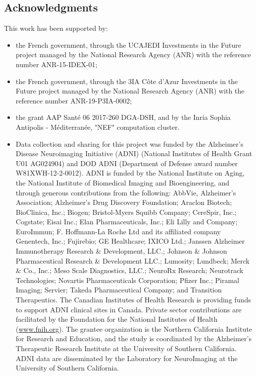 \subsection*{Acknowledgments}
\label{sec:ack}

This work has been supported by:
\begin{itemize}
\item the French government, through the UCAJEDI Investments in the Future project managed by the National Research Agency (ANR) with the reference number ANR-15-IDEX-01;
\item the French government, through the 3IA Côte d'Azur Investments in the Future project managed by the National Research Agency (ANR) with the reference number ANR-19-P3IA-0002;
\item the grant AAP Santé 06 2017-260 DGA-DSH, and by the Inria Sophia Antipolis - Méditerranée, "NEF" computation cluster.
\item Data collection and sharing for this project was funded by the Alzheimer's Disease Neuroimaging Initiative (ADNI) (National Institutes of Health Grant U01 AG024904) and DOD ADNI (Department of Defense award number W81XWH-12-2-0012).
ADNI is funded by the National Institute on Aging, the National Institute of Biomedical Imaging and Bioengineering, and through generous contributions from the following: AbbVie, Alzheimer's Association; Alzheimer's Drug Discovery Foundation; Araclon Biotech; BioClinica, Inc.; Biogen; Bristol-Myers Squibb Company; CereSpir, Inc.; Cogstate; Eisai Inc.; Elan Pharmaceuticals, Inc.; Eli Lilly and Company; EuroImmun; F. Hoffmann-La Roche Ltd and its affiliated company Genentech, Inc.; Fujirebio; GE Healthcare; IXICO Ltd.; Janssen Alzheimer Immunotherapy Research \& Development, LLC.; Johnson \& Johnson Pharmaceutical Research \& Development LLC.; Lumosity; Lundbeck; Merck \& Co., Inc.; Meso Scale Diagnostics, LLC.; NeuroRx Research; Neurotrack Technologies; Novartis Pharmaceuticals Corporation; Pfizer Inc.; Piramal Imaging; Servier; Takeda Pharmaceutical Company; and Transition Therapeutics.
The Canadian Institutes of Health Research is providing funds to support ADNI clinical sites in Canada.
Private sector contributions are facilitated by the Foundation for the National Institutes of Health (\url{www.fnih.org}).
The grantee organization is the Northern California Institute for Research and Education, and the study is coordinated by the Alzheimer's Therapeutic Research Institute at the University of Southern California.
ADNI data are disseminated by the Laboratory for NeuroImaging at the University of Southern California.

\end{itemize}
